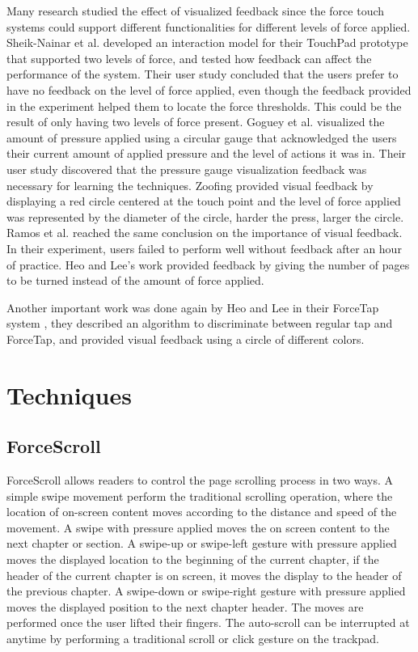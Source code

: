 \documentclass{sigchi}
\begin{document}
Many research studied the effect of visualized feedback since the force touch systems could support different functionalities for different levels of force applied. Sheik-Nainar et al. \cite{sheik2013two} developed an interaction model for their TouchPad prototype that supported two levels of force, and tested how feedback can affect the performance of the system. Their user study concluded that the users prefer to have no feedback on the level of force applied, even though the feedback provided in the experiment helped them to locate the force thresholds. This could be the result of only having two levels of force present. Goguey et al. \cite{goguey2018improving} visualized the amount of pressure applied using a circular gauge that acknowledged the users their current amount of applied pressure and the level of actions it was in. Their user study discovered that the pressure gauge visualization feedback was necessary for learning the techniques. Zoofing \cite{quinn2009zoofing} provided visual feedback by displaying a red circle centered at the touch point and the level of force applied was represented by the diameter of the circle, harder the press, larger the circle. Ramos et al. \cite{ramos2004pressure} reached the same conclusion on the importance of visual feedback. In their experiment, users failed to perform well without feedback after an hour of practice. Heo and Lee's work \cite{heo2011force} provided feedback by giving the number of pages to be turned instead of the amount of force applied. 

Another important work was done again by Heo and Lee in their ForceTap system \cite{heo2011forcetap}, they described an algorithm to discriminate between regular tap and ForceTap, and provided visual feedback using a circle of different colors.    

\section{Techniques}
\subsection{ForceScroll}
ForceScroll allows readers to control the page scrolling process in two ways. A simple swipe movement perform the traditional scrolling operation, where the location of on-screen content moves according to the distance and speed of the movement. A swipe with pressure applied moves the on screen content to the next chapter or section. A swipe-up or swipe-left gesture with pressure applied moves the displayed location to the beginning of the current chapter, if the header of the current chapter is on screen, it moves the display to the header of the previous chapter. A swipe-down or swipe-right gesture with pressure applied moves the displayed position to the next chapter header. The moves are performed once the user lifted their fingers. The auto-scroll can be interrupted at anytime by performing a traditional scroll or click gesture on the trackpad.
\end{document}
